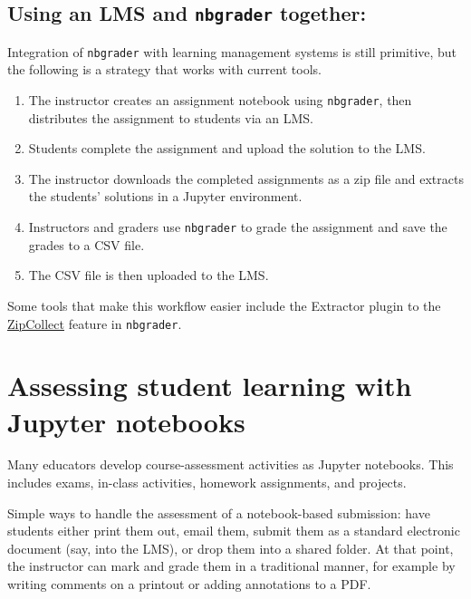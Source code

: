 \documentclass[]{book}
\begin{document}
\hypertarget{using-an-lms-and-nbgrader-together}{%
\subsection{\texorpdfstring{Using an LMS and \texttt{nbgrader} together:}{Using an LMS and nbgrader together:}}\label{using-an-lms-and-nbgrader-together}}

Integration of \texttt{nbgrader} with learning management systems is still
primitive, but the following is a strategy that works with current
tools.

\begin{enumerate}
\def\labelenumi{\arabic{enumi}.}
\item
  The instructor creates an assignment notebook using \texttt{nbgrader}, then
  distributes the assignment to students via an LMS.
\item
  Students complete the assignment and upload the solution to the
  LMS.
\item
  The instructor downloads the completed assignments as a zip file and
  extracts the students' solutions in a Jupyter environment.
\item
  Instructors and graders use \texttt{nbgrader} to grade the assignment and
  save the grades to a CSV file.
\item
  The CSV file is then uploaded to the LMS.
\end{enumerate}

Some tools that make this workflow easier include
the Extractor plugin to the \href{https://nbgrader.readthedocs.io/en/stable/plugins/zipcollect-plugin.html}{ZipCollect} feature in \texttt{nbgrader}.

\hypertarget{assessing-student-learning-with-jupyter-notebooks}{%
\section{Assessing student learning with Jupyter notebooks}\label{assessing-student-learning-with-jupyter-notebooks}}

Many educators develop course-assessment activities as Jupyter
notebooks. This includes exams, in-class activities, homework
assignments, and projects.

Simple ways to handle the assessment of a notebook-based submission: have students either print them out, email them, submit them as
a standard electronic document (say, into the LMS),
or drop them into a shared folder. At that point, the instructor can
mark and grade them in a traditional manner, for example by
writing comments on a printout or adding annotations to a PDF.
\end{document}
